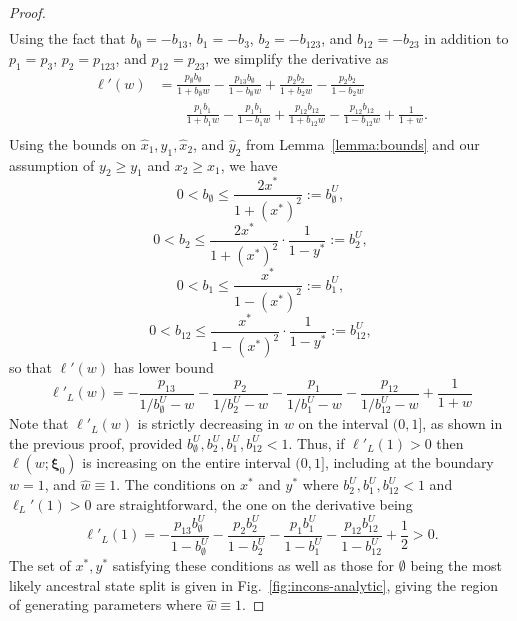 \begin{proof}
\begin{align*}
\end{align*}
Using the fact that $b_{\emptyset} = -b_{13}$, $b_{1} = -b_{3}$, $b_{2} = -b_{123}$, and $b_{12} = -b_{23}$ in addition to $p_{1} = p_{3}$, $p_{2} = p_{123}$, and $p_{12} = p_{23}$, we simplify the derivative as
\begin{align*}
\ell'(w) &=  \frac{p_{\emptyset}b_{\emptyset}}{1 + b_{\emptyset}w} - \frac{p_{13}b_{\emptyset}}{1 - b_{\emptyset}w} + \frac{p_{2}b_{2}}{1 + b_{2}w} - \frac{p_{2}b_{2}}{1 - b_{2}w} \\
         &\qquad \frac{p_{1}b_{1}}{1 + b_{1}w} - \frac{p_{1}b_{1}}{1 - b_{1}w} + \frac{p_{12}b_{12}}{1 + b_{12}w} - \frac{p_{12}b_{12}}{1 - b_{12}w} + \frac{1}{1+w}.\\
\end{align*}
Using the bounds on $\hat{x}_1,\hat{y}_1,\hat{x}_2$, and $\hat{y}_2$ from Lemma~\ref{lemma:bounds} and our assumption of $y_2 \ge y_1$ and $x_2 \ge x_1$, we have
\[
0 < b_{\emptyset} \le \frac{2x^*}{1+(x^*)^2} := b_{\emptyset}^U,
\]
\[
0 < b_{2} \le \frac{2x^*}{1+(x^*)^2}\cdot\frac{1}{1-y^*} := b_{2}^U,
\]
\[
0 < b_{1} \le \frac{x^*}{1-(x^*)^2} := b_{1}^U,
\]
\[
0 < b_{12} \le \frac{x^*}{1-(x^*)^2}\cdot\frac{1}{1-y^*} := b_{12}^U,
\]
so that $\ell'(w)$ has lower bound
\[
\ell'_{L}(w) =  -\frac{p_{13}}{1/b_{\emptyset}^U - w} - \frac{p_{2}}{1/b_{2}^U - w} - \frac{p_{1}}{1/b_{1}^U - w} - \frac{p_{12}}{1/b_{12}^U - w} + \frac{1}{1+w}
\]
Note that $\ell'_{L}(w)$ is strictly decreasing in $w$ on the interval $(0,1]$, as shown in the previous proof, provided $b_{\emptyset}^U, b_{2}^U, b_{1}^U, b_{12}^U < 1$.
Thus, if $\ell'_{L}(1) > 0$ then $\ell(w; \boldsymbol\xi_0)$ is increasing on the entire interval $(0,1]$, including at the boundary $w=1$, and $\hat{w} \equiv 1$.
The conditions on $x^*$ and $y^*$ where $b_{2}^U, b_{1}^U, b_{12}^U < 1$ and $\ell_L'(1) > 0$ are straightforward, the one on the derivative being
\[
\ell'_{L}(1) =  -\frac{p_{13}b_{\emptyset}^U}{1-b_{\emptyset}^U} - \frac{p_{2}b_{2}^U}{1-b_{2}^U} - \frac{p_{1}b_{1}^U}{1-b_{1}^U} - \frac{p_{12}b_{12}^U}{1-b_{12}^U} + \frac{1}{2} > 0.
\]
The set of $x^*,y^*$ satisfying these conditions as well as those for $\emptyset$ being the most likely ancestral state split is given in Fig.~\ref{fig:incons-analytic}, giving the region of generating parameters where $\hat{w}\equiv 1$.
\end{proof}

